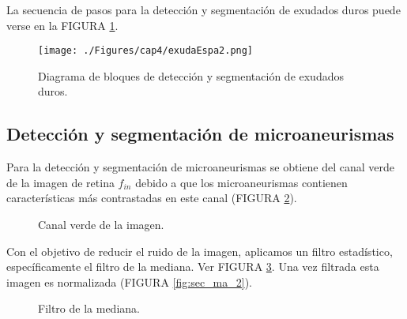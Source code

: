 La secuencia de pasos para la detección y segmentación de exudados duros puede verse en la FIGURA \ref{fig:diaExu}.
\begin{figure}[H]
	\centering
		\texttt{[image: ./Figures/cap4/exudaEspa2.png]}
	\caption{Diagrama de bloques de detección y segmentación de exudados duros.}
	\label{fig:diaExu}
\end{figure}


\subsection{Detección y segmentación de microaneurismas} 

Para la detección y segmentación de microaneurismas se obtiene del canal verde de la imagen de retina $f_{in}$ debido a que los microaneurismas contienen características más contrastadas en este canal (FIGURA \ref{fig:sec_ma_0}). 
\begin{figure}[H]
\centering
{}
\caption{Canal verde de la imagen.} \label{fig:sec_ma_0}
\end{figure}

Con el objetivo de reducir el ruido de la imagen, aplicamos un filtro estadístico, específicamente el filtro de la mediana. Ver FIGURA \ref{fig:sec_ma_1}. Una vez filtrada esta imagen es normalizada (FIGURA \ref{fig:sec_ma_2}).


\begin{figure}[H]
\centering
{}
\caption{Filtro de la mediana.} \label{fig:sec_ma_1}
\end{figure}

